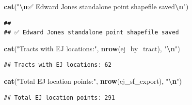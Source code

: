 \documentclass[
]{article}
\newenvironment{Shaded}{\begin{snugshade}}{\end{snugshade}}
\newcommand{\FunctionTok}[1]{\textcolor[rgb]{0.13,0.29,0.53}{\textbf{#1}}}
\newcommand{\NormalTok}[1]{#1}
\newcommand{\SpecialCharTok}[1]{\textcolor[rgb]{0.81,0.36,0.00}{\textbf{#1}}}
\newcommand{\StringTok}[1]{\textcolor[rgb]{0.31,0.60,0.02}{#1}}
\begin{document}
\begin{Shaded}
\begin{Highlighting}[]
\FunctionTok{cat}\NormalTok{(}\StringTok{"}\SpecialCharTok{\textbackslash{}n}\StringTok{✅ Edward Jones standalone point shapefile saved}\SpecialCharTok{\textbackslash{}n}\StringTok{"}\NormalTok{)}
\end{Highlighting}
\end{Shaded}

\begin{verbatim}
## 
## ✅ Edward Jones standalone point shapefile saved
\end{verbatim}

\begin{Shaded}
\begin{Highlighting}[]
\FunctionTok{cat}\NormalTok{(}\StringTok{"Tracts with EJ locations:"}\NormalTok{, }\FunctionTok{nrow}\NormalTok{(ej\_by\_tract), }\StringTok{"}\SpecialCharTok{\textbackslash{}n}\StringTok{"}\NormalTok{)}
\end{Highlighting}
\end{Shaded}

\begin{verbatim}
## Tracts with EJ locations: 62
\end{verbatim}

\begin{Shaded}
\begin{Highlighting}[]
\FunctionTok{cat}\NormalTok{(}\StringTok{"Total EJ location points:"}\NormalTok{, }\FunctionTok{nrow}\NormalTok{(ej\_sf\_export), }\StringTok{"}\SpecialCharTok{\textbackslash{}n}\StringTok{"}\NormalTok{)}
\end{Highlighting}
\end{Shaded}

\begin{verbatim}
## Total EJ location points: 291
\end{verbatim}
\end{document}
